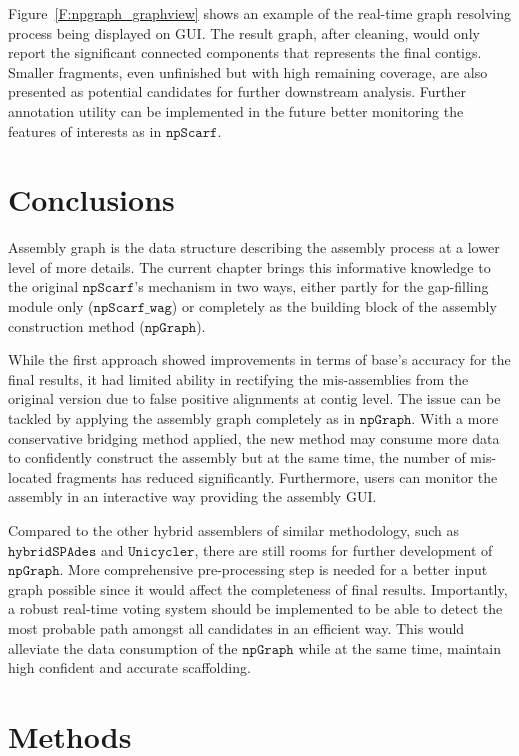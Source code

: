 \documentclass[10pt,twocolumn,twoside]{genpaper}
\newcommand{\npscarf}{$\mathtt{npScarf}$}
\newcommand{\npscarfg}{$\mathtt{npScarf\_wag}$}
\newcommand{\npgraph}{$\mathtt{npGraph}$}
\newcommand{\unicycler}{$\mathtt{Unicycler}$}
\begin{document}
Figure~\ref{F:npgraph_graphview} shows an example of the real-time graph resolving process being displayed on GUI.
The result graph, after cleaning, would only report the significant connected components that represents the final contigs.
Smaller fragments, even unfinished but with high remaining coverage, are also presented as potential candidates for further downstream analysis.
Further annotation utility can be implemented in the future better monitoring the features of interests as in \npscarf{}.
\section*{Conclusions}
Assembly graph is the data structure describing the assembly process at a lower level of more details.
The current chapter brings this informative knowledge to the original \npscarf{}'s mechanism in two ways, either partly for the gap-filling module only (\npscarfg{}) or completely as the building block of the assembly construction method (\npgraph{}).

While the first approach showed improvements in terms of base's accuracy for the final results, it had limited ability in rectifying the mis-assemblies from the original version due to false positive alignments at contig level.
The issue can be tackled by applying the assembly graph completely as in \npgraph{}.
With a more conservative bridging method applied, the new method may consume more data to confidently construct the assembly but at the same time, the number of mis-located fragments has reduced significantly.
Furthermore, users can monitor the assembly in an interactive way providing the assembly GUI.

Compared to the other hybrid assemblers of similar methodology, such as $\mathtt{hybridSPAdes}$ and \unicycler{}, there are still rooms for further development of \npgraph{}. 
More comprehensive pre-processing step is needed for a better input graph possible since it would affect the completeness of final results. 
Importantly, a robust real-time voting system should be implemented to be able to detect the most probable path amongst all candidates in an efficient way.
This would alleviate the data consumption of the \npgraph{} while at the same time, maintain high confident and accurate scaffolding. 


\section*{Methods}
\end{document}
